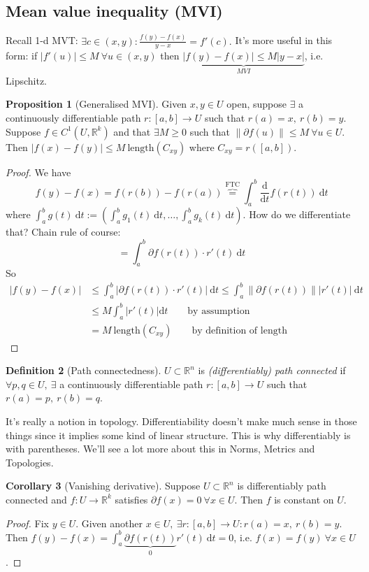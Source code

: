 \documentclass[a4paper]{article}
\theoremstyle{definition}
\newtheorem{defn}{Definition}[subsection]
\newtheorem{prop}[defn]{Proposition}
\newtheorem{coro}[defn]{Corollary}
\begin{document}
\subsection{Mean value inequality (MVI)}
Recall 1-d MVT: $\exists c\in (x,y): \frac{f(y)-f(x)}{y-x}=f'(c).$ It's more useful in this form: if $|f'(u)|\leq M \ \forall u\in (x,y)$ then $\underbrace{|f(y)-f(x)| \leq M|y-x|}_{MVI}$, i.e. Lipschitz.
\begin{prop}[Generalised MVI]
Given $x,y \in U$ open, suppose $\exists$ a continuously differentiable path $r:[a,b] \rightarrow U$ such that $r(a)=x,\ r(b)=y$. Suppose $f\in C^1 (U,\mathbb R^k)$ and that $\exists M\geq 0$ such that $\|\partial f(u)\|\leq M \ \forall u\in U$. Then $|f(x)-f(y)|\leq M \ \text{length} (C_{xy})$ where $C_{xy}=r([a,b])$.
\end{prop}
\begin{proof}
We have
\[
f(y)-f(x) = f(r(b))-f(r(a)) \overbrace{=}^{\text{FTC}} \int_a^b \frac{\mathrm d}{\mathrm d t} f(r(t)) \ \mathrm d t
\]
where $\int_a^b g(t) \ \mathrm d t := \left( \int_a^b g_1(t) \ \mathrm d t,\ldots, \int_a^b g_k(t) \ \mathrm d t \right).$ How do we differentiate that? Chain rule of course:
\[
=\int_a^b \partial f(r(t)) \cdot r'(t) \ \mathrm d t
\]
So
\[
\begin{aligned}
|f(y)-f(x)| &\leq \int_a^b \left| \partial f(r(t)) \cdot r'(t) \right| \ \mathrm d t \leq \int_a^b \|\partial f(r(t)) \| |r'(t)| \ \mathrm d t \\ &\leq M \int_a^b |r'(t)| \mathrm d t \qquad \text{by assumption} \\& = M \ \text{length} (C_{xy}) \qquad \text{by definition of length}
\end{aligned}
\]
\end{proof}
\begin{defn}[Path connectedness]
$U\subset \mathbb R^n$ is \textit{(differentiably) path connected} if $\forall p,q \in U,\ \exists$ a continuously differentiable path $r:[a,b]\rightarrow U$ such that $r(a)=p,\ r(b)=q$.
\end{defn}
It's really a notion in topology. Differentiability doesn't make much sense in those things since it implies some kind of linear structure. This is why differentiably is with parentheses. We'll see a lot more about this in Norms, Metrics and Topologies.

\begin{coro}[Vanishing derivative]
Suppose $U\subset \mathbb R^n$ is differentiably path connected and $f:U\rightarrow \mathbb R^k$ satisfies $\partial f(x)=0 \ \forall x\in U$. Then $f$ is constant on $U$.
\end{coro}
\begin{proof}
Fix $y\in U$. Given another $x\in U, \ \exists r:[a,b]\rightarrow U:r(a)=x,\ r(b)=y$. Then $f(y)-f(x) =\int_a^b \underbrace{\partial f(r(t))}_{0} r'(t) \ \mathrm d t = 0$, i.e. $f(x)=f(y) \ \forall x\in U$.
\end{proof}
\end{document}
